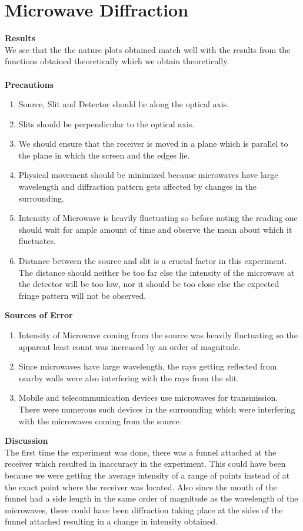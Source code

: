 \documentclass[12pt]{report}
\begin{document}
\section{Microwave Diffraction}
\textbf{Results}\\
We see that the the nature plots obtained match well with the results from the functions obtained theoretically which we obtain theoretically.\\\\
\textbf{Precautions}
\begin{enumerate}
	\item Source, Slit and Detector should lie along the optical axis.
	\item Slits should be perpendicular to the optical axis.
	\item We should ensure that the receiver is moved in a plane which is parallel to the plane in which the screen and the edges lie.
	\item Physical movement should be minimized because microwaves have large wavelength and diffraction pattern gets affected by changes in the surrounding.
	\item Intensity of Microwave is heavily fluctuating so before noting the reading one should wait for ample amount of time and observe the mean about which it fluctuates. 
	\item Distance between the source and slit is a crucial factor in this experiment. The distance should neither be too far else the intensity of the microwave at the detector will be too low, nor it should be too close else the expected fringe pattern will not be observed. 
\end{enumerate}
\textbf{Sources of Error}
\begin{enumerate}
	\item Intensity of Microwave coming from the source was heavily fluctuating so the apparent least count was increased by an order of magnitude. 
	\item Since microwaves have large wavelength, the rays getting reflected from nearby walls were also interfering with the rays from the slit.
	\item Mobile and telecommunication devices use microwaves for transmission. There were numerous such devices in the surrounding which were interfering with the microwaves coming from the source. 
\end{enumerate}
\textbf{Discussion}\\
The first time the experiment was done, there was a funnel attached at the receiver which resulted in inaccuracy in the experiment. This could have been because we were getting the average intensity of a range of points instead of at the exact point where the receiver was located. Also since the mouth of the funnel had a side length in the same order of magnitude as the wavelength of the microwaves, there could have been diffraction taking place at the sides of the funnel attached resulting in a change in intensity obtained.\\
\end{document}
